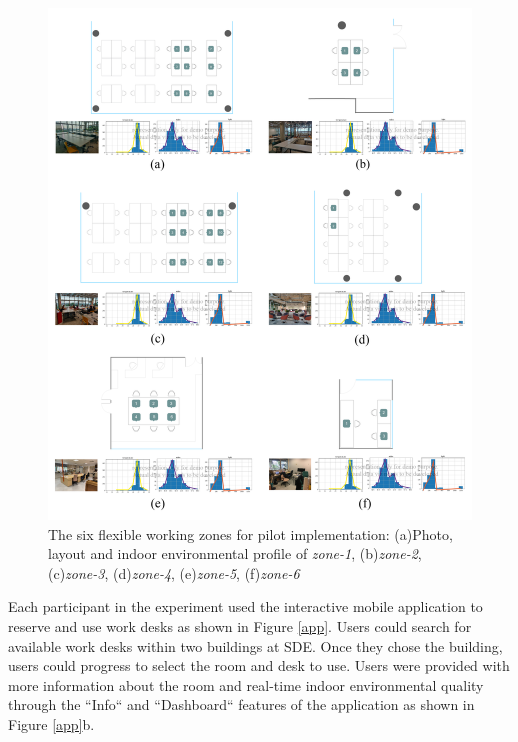 \documentclass[]{interact}
\theoremstyle{plain}%
\theoremstyle{definition}
\theoremstyle{remark}
\begin{document}
\begin{figure}[H]
\centering
\includegraphics[scale=0.7]{figures/pilot-01.jpg}
\caption{The six flexible working zones for pilot implementation: (a)Photo, layout and indoor environmental profile of \emph{zone-1}, (b)\emph{zone-2}, (c)\emph{zone-3}, (d)\emph{zone-4}, (e)\emph{zone-5}, (f)\emph{zone-6}}
\label{pilot}
\end{figure}


Each participant in the experiment used the interactive mobile application to reserve and use work desks as shown in Figure \ref{app}. Users could search for available work desks within two buildings at SDE. Once they chose the building, users could progress to select the room and desk to use. Users were provided with more information about the room and real-time indoor environmental quality through the ``Info`` and ``Dashboard`` features of the application as shown in Figure \ref{app}b. 
\end{document}
